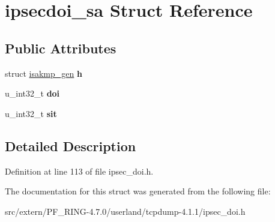 \hypertarget{structipsecdoi__sa}{
\section{ipsecdoi\_\-sa Struct Reference}
\label{structipsecdoi__sa}
}
\subsection*{Public Attributes}
\begin{DoxyCompactItemize}
\item 
\hypertarget{structipsecdoi__sa_a95c8069376483692dd13f4b217f2baed}{
struct \hyperlink{structisakmp__gen}{isakmp\_\-gen} {\bfseries h}}
\label{structipsecdoi__sa_a95c8069376483692dd13f4b217f2baed}

\item 
\hypertarget{structipsecdoi__sa_a00fb5db4f5803fcf6823798971902a8d}{
u\_\-int32\_\-t {\bfseries doi}}
\label{structipsecdoi__sa_a00fb5db4f5803fcf6823798971902a8d}

\item 
\hypertarget{structipsecdoi__sa_a8564e05c554b4e8dc6a9a4564b8e9889}{
u\_\-int32\_\-t {\bfseries sit}}
\label{structipsecdoi__sa_a8564e05c554b4e8dc6a9a4564b8e9889}

\end{DoxyCompactItemize}


\subsection{Detailed Description}


Definition at line 113 of file ipsec\_\-doi.h.



The documentation for this struct was generated from the following file:\begin{DoxyCompactItemize}
\item 
src/extern/PF\_\-RING-\/4.7.0/userland/tcpdump-\/4.1.1/ipsec\_\-doi.h\end{DoxyCompactItemize}
